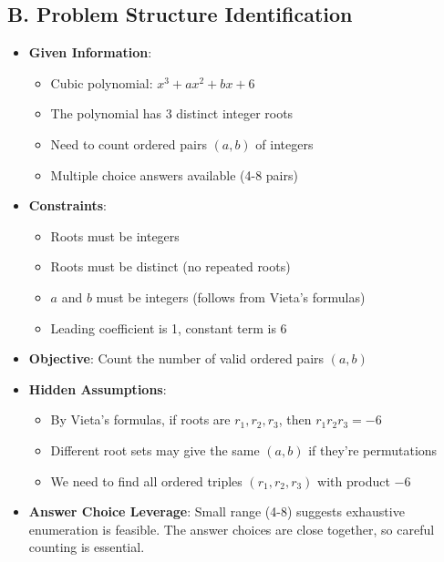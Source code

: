 \documentclass[12pt]{article}
\begin{document}
\begin{problemconfigbox}
\subsection*{B. Problem Structure Identification}
\begin{itemize}[leftmargin=*]
    \item \textbf{Given Information}: 
    \begin{itemize}
        \item Cubic polynomial: $x^3 + ax^2 + bx + 6$
        \item The polynomial has 3 distinct integer roots
        \item Need to count ordered pairs $(a,b)$ of integers
        \item Multiple choice answers available (4-8 pairs)
    \end{itemize}
    \item \textbf{Constraints}: 
    \begin{itemize}
        \item Roots must be integers
        \item Roots must be distinct (no repeated roots)
        \item $a$ and $b$ must be integers (follows from Vieta's formulas)
        \item Leading coefficient is 1, constant term is 6
    \end{itemize}
    \item \textbf{Objective}: Count the number of valid ordered pairs $(a,b)$
    \item \textbf{Hidden Assumptions}: 
    \begin{itemize}
        \item By Vieta's formulas, if roots are $r_1, r_2, r_3$, then $r_1 r_2 r_3 = -6$
        \item Different root sets may give the same $(a,b)$ if they're permutations
        \item We need to find all ordered triples $(r_1, r_2, r_3)$ with product $-6$
    \end{itemize}
    \item \textbf{Answer Choice Leverage}: Small range (4-8) suggests exhaustive enumeration is feasible. The answer choices are close together, so careful counting is essential.
\end{itemize}


\end{problemconfigbox}
\end{document}
